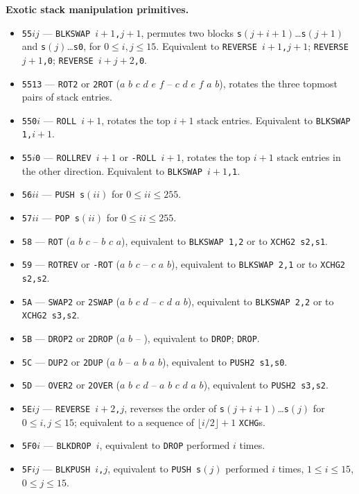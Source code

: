 \documentclass[12pt,oneside]{article}
\def\makepoint#1{\medbreak\noindent{\bf #1.\ }}
\def\nxsubpoint{\refstepcounter{subsubsection}%
    \smallbreak\makepoint{\thesubsubsection}}
\def\emb#1{\textbf{#1.}}
\begin{document}
\nxsubpoint\emb{Exotic stack manipulation primitives}
\begin{itemize}
\item {\tt 55$ij$} --- {\tt BLKSWAP $i+1$,$j+1$}, permutes two blocks {\tt s$(j+i+1)$}\dots{\tt s$(j+1)$} and {\tt s$(j)$}\dots{\tt s0}, for $0\leq i,j\leq15$. Equivalent to {\tt REVERSE $i+1$,$j+1$}; {\tt REVERSE $j+1$,0}; {\tt REVERSE $i+j+2$,0}.
\item {\tt 5513} --- {\tt ROT2} or {\tt 2ROT} ($a$ $b$ $c$ $d$ $e$ $f$ -- $c$ $d$ $e$ $f$ $a$ $b$), rotates the three topmost pairs of stack entries.
\item {\tt 550$i$} --- {\tt ROLL $i+1$}, rotates the top $i+1$ stack entries. Equivalent to {\tt BLKSWAP 1,$i+1$}.
\item {\tt 55$i$0} --- {\tt ROLLREV $i+1$} or {\tt -ROLL $i+1$}, rotates the top $i+1$ stack entries in the other direction. Equivalent to {\tt BLKSWAP $i+1$,1}.
\item {\tt 56$ii$} --- {\tt PUSH s$(ii)$} for $0\leq ii\leq 255$.
\item {\tt 57$ii$} --- {\tt POP s$(ii)$} for $0\leq ii\leq 255$.
\item {\tt 58} --- {\tt ROT} ($a$ $b$ $c$ -- $b$ $c$ $a$), equivalent to {\tt BLKSWAP 1,2} or to {\tt XCHG2 s2,s1}.
\item {\tt 59} --- {\tt ROTREV} or {\tt -ROT} ($a$ $b$ $c$ -- $c$ $a$ $b$), equivalent to {\tt BLKSWAP 2,1} or to {\tt XCHG2 s2,s2}.
\item {\tt 5A} --- {\tt SWAP2} or {\tt 2SWAP} ($a$ $b$ $c$ $d$ -- $c$ $d$ $a$ $b$), equivalent to {\tt BLKSWAP 2,2} or to {\tt XCHG2 s3,s2}.
\item {\tt 5B} --- {\tt DROP2} or {\tt 2DROP} ($a$ $b$ -- ), equivalent to {\tt DROP}; {\tt DROP}.
\item {\tt 5C} --- {\tt DUP2} or {\tt 2DUP} ($a$ $b$ -- $a$ $b$ $a$ $b$), equivalent to {\tt PUSH2 s1,s0}.
\item {\tt 5D} --- {\tt OVER2} or {\tt 2OVER} ($a$ $b$ $c$ $d$ -- $a$ $b$ $c$ $d$ $a$ $b$), equivalent to {\tt PUSH2 s3,s2}.
\item {\tt 5E$ij$} --- {\tt REVERSE $i+2$,$j$}, reverses the order of {\tt s$(j+i+1)$}\dots{\tt s$(j)$} for $0\leq i,j\leq 15$; equivalent to a sequence of $\lfloor i/2\rfloor+1$ {\tt XCHG}s.
\item {\tt 5F0$i$} --- {\tt BLKDROP $i$}, equivalent to {\tt DROP} performed $i$ times.
\item {\tt 5F$ij$} --- {\tt BLKPUSH $i$,$j$}, equivalent to {\tt PUSH s$(j)$} performed $i$ times, $1\leq i\leq 15$, $0\leq j\leq 15$.

\end{itemize}
\end{document}
